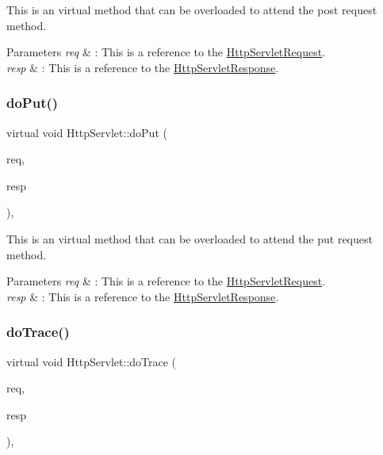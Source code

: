 This is an virtual method that can be overloaded to attend the post request method. 


\begin{DoxyParams}{Parameters}
{\em req} & \+: This is a reference to the \hyperlink{class_http_servlet_request}{Http\+Servlet\+Request}. \\
\hline
{\em resp} & \+: This is a reference to the \hyperlink{class_http_servlet_response}{Http\+Servlet\+Response}. \\
\hline
\end{DoxyParams}
\mbox{\label{class_http_servlet_a3e92ff7912f54a5515681637a912eb47}} 
\subsubsection{\texorpdfstring{do\+Put()}{doPut()}}
{\footnotesize\ttfamily virtual void Http\+Servlet\+::do\+Put (\begin{DoxyParamCaption}\item[{\hyperlink{class_http_servlet_request}{Http\+Servlet\+Request} \&}]{req,  }\item[{\hyperlink{class_http_servlet_response}{Http\+Servlet\+Response} \&}]{resp }\end{DoxyParamCaption})\hspace{0.3cm}{\ttfamily [inline]}, {\ttfamily [virtual]}}



This is an virtual method that can be overloaded to attend the put request method. 


\begin{DoxyParams}{Parameters}
{\em req} & \+: This is a reference to the \hyperlink{class_http_servlet_request}{Http\+Servlet\+Request}. \\
\hline
{\em resp} & \+: This is a reference to the \hyperlink{class_http_servlet_response}{Http\+Servlet\+Response}. \\
\hline
\end{DoxyParams}
\mbox{\label{class_http_servlet_a83219b58e63bbe96fa2373a043043e20}} 
\subsubsection{\texorpdfstring{do\+Trace()}{doTrace()}}
{\footnotesize\ttfamily virtual void Http\+Servlet\+::do\+Trace (\begin{DoxyParamCaption}\item[{\hyperlink{class_http_servlet_request}{Http\+Servlet\+Request} \&}]{req,  }\item[{\hyperlink{class_http_servlet_response}{Http\+Servlet\+Response} \&}]{resp }\end{DoxyParamCaption})\hspace{0.3cm}{\ttfamily [inline]}, {\ttfamily [virtual]}}



